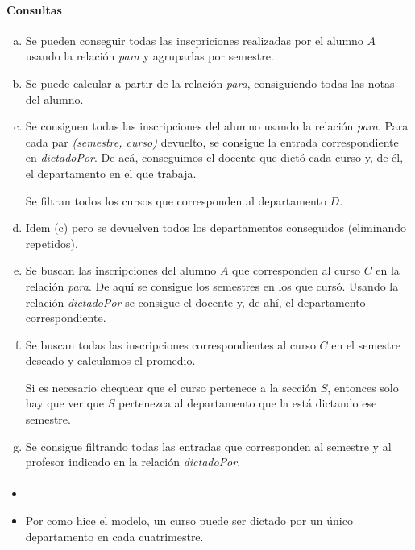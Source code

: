\begin{multicols}{2}
	\columnbreak
	\paragraph{Consultas}
	
	\begin{enumerate}[(a)]
		\item Se pueden conseguir todas las inscpriciones realizadas por el alumno $A$ usando la relación \textit{para} y agruparlas por semestre.
		
		\item Se puede calcular a partir de la relación \textit{para}, consiguiendo todas las notas del alumno.
		
		\item Se consiguen todas las inscripciones del alumno usando la relación \textit{para}. Para cada par \textit{(semestre, curso)} devuelto, se consigue la entrada correspondiente en \textit{dictadoPor}. De acá, conseguimos el docente que dictó cada curso y, de él, el departamento en el que trabaja.
		
		Se filtran todos los cursos que corresponden al departamento $D$. 
		
		\item Idem (c) pero se devuelven todos los departamentos conseguidos (eliminando repetidos).
		
		\item Se buscan las inscripciones del alumno $A$ que corresponden al curso $C$ en la relación \textit{para}. De aquí se consigue los semestres en los que cursó. Usando la relación \textit{dictadoPor} se consigue el docente y, de ahí, el departamento correspondiente.
		
		\item Se buscan todas las inscripciones correspondientes al curso $C$ en el semestre deseado y calculamos el promedio.
		
		Si es necesario chequear que el curso pertenece a la sección $S$, entonces solo hay que ver que $S$ pertenezca al departamento que la está dictando ese semestre.
		
		\item Se consigue filtrando todas las entradas que corresponden al semestre y al profesor indicado en la relación \textit{dictadoPor}.	
	\end{enumerate}
	
	\paragraph{}
	\begin{itemize}
		\item {}
		\item Por como hice el modelo, un curso puede ser dictado por un único departamento en cada cuatrimestre.
	\end{itemize}
	
\end{multicols}
